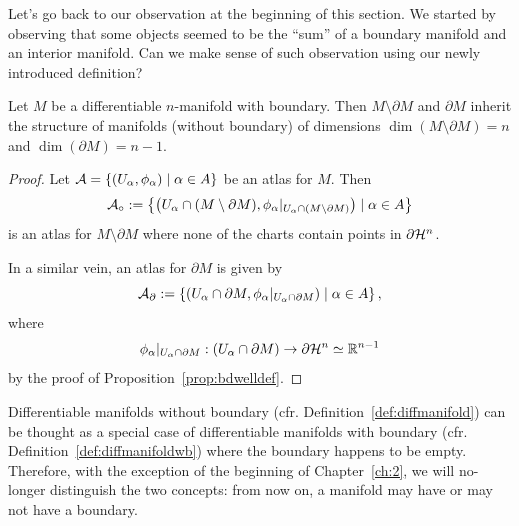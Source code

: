 Let's go back to our observation at the beginning of this section.
We started by observing that some objects seemed to be the ``sum'' of a boundary manifold and an interior manifold.
Can we make sense of such observation using our newly introduced definition?

\begin{proposition}
  Let $M$ be a differentiable $n$-manifold with boundary.
  Then $M\setminus\partial M$ and $\partial M$ inherit the structure of manifolds (without boundary) of dimensions $\dim(M\setminus\partial M)=n$ and $\dim(\partial M) = n-1$.
\end{proposition}
\begin{proof}
  Let $\mathcal{A} = \{(U_\alpha,\phi_\alpha) \mid \alpha\in A\}$ be an atlas for $M$. 
  Then
  \begin{equation}
    \mathcal{A}_\circ := \left\{
      \left(
        U_\alpha \cap (M\setminus\partial M),
        \phi_\alpha|_{U_\alpha \cap (M\setminus\partial M)}
        \right) \mid \alpha\in A
      \right\}
  \end{equation}
  is an atlas for $M\setminus\partial M$ where none of the charts contain points in $\partial\mathcal{H}^n$.

  In a similar vein, an atlas for $\partial M$ is given by
  \begin{equation}
    \mathcal{A}_\partial := \left\{
      \left(
        U_\alpha \cap \partial M,
        \phi_\alpha|_{U_\alpha \cap \partial M}
        \right) \mid \alpha\in A
      \right\},
  \end{equation}
  where
  \begin{equation}
    \phi_\alpha|_{U_\alpha \cap \partial M} : (U_\alpha \cap \partial M) \to \partial\mathcal{H}^n\simeq\mathbb{R}^{n-1}
  \end{equation}
  by the proof of Proposition~\ref{prop:bdwelldef}.
\end{proof}

\begin{tcolorbox}
  Differentiable manifolds without boundary (cfr. Definition~\ref{def:diffmanifold}) can be thought as a special case of differentiable manifolds with boundary (cfr. Definition~\ref{def:diffmanifoldwb}) where the boundary happens to be empty.
  Therefore, with the exception of the beginning of Chapter~\ref{ch:2}, we will no-longer distinguish the two concepts: from now on, a manifold may have or may not have a boundary.
\end{tcolorbox}